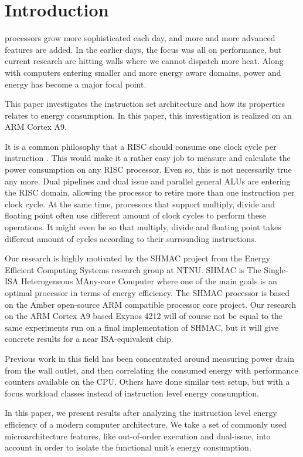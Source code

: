 \section{Introduction}

 processors grow more sophisticated each day, and more
and more advanced features are added. In the earlier days, the focus was all on
performance, but current research are hitting walls where we cannot dispatch more heat.
Along with computers entering smaller and more energy aware domains, power and
energy has become a major focal point\cite{patterson}\cite{hennessy}.

This paper investigates the instruction set architecture and how its properties
relates to energy consumption. In this paper, this investigation is realized on
an ARM Cortex A9.

It is a common philosophy that a RISC should consume one clock cycle per
instruction \cite{sivarama}. This would make it a rather easy job to measure
and calculate the power consumption on any RISC processor. Even so, this is not
necessarily true any more.  Dual pipelines and dual issue and parallel general
ALUs are entering the RISC domain, allowing the processor to retire more than
one instruction per clock cycle. At the same time, processors that support
multiply, divide and floating point often use different amount of clock cycles
to perform these operations. It might even be so that multiply, divide and
floating point takes different amount of cycles according to their surrounding
instructions.

Our research is highly motivated by the SHMAC project from the Energy Efficient
Computing Systems research group at NTNU. SHMAC is The Single-ISA Heterogeneous
MAny-core Computer where one of the main goals is an optimal processor in terms
of energy efficiency. The SHMAC processor is based on the Amber open-source ARM
compatible processor core project. Our research on the ARM Cortex A9
based Exynos 4212 will of course not be equal to the same experiments run on
a final implementation of SHMAC, but it will give concrete results for a near
ISA-equivalent chip.

Previous work in this field has been concentrated around measuring power drain
from the wall outlet, and then correlating the consumed energy with performance
counters available on the CPU\cite{singh}\cite{bertran}\cite{bircher}. Others
have done similar test setup, but with a focus workload classes instead of
instruction level energy consumption\cite{carroll2010analysis}.

In this paper, we present results after analyzing the instruction level energy
efficiency of a modern computer architecture. We take a set of commonly used
microarchitecture features, like out-of-order execution and dual-issue, into
account in order to isolate the functional unit's energy consumption.

